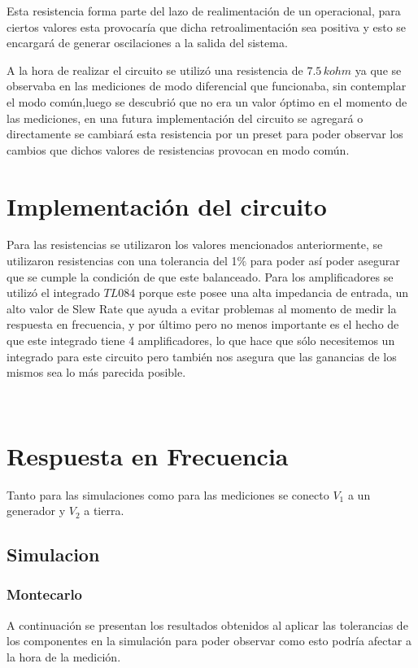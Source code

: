 \documentclass[11pt, a4paper]{article}
\begin{document}
	Esta resistencia forma parte del lazo de realimentación de un operacional, para ciertos valores esta provocaría que dicha retroalimentación sea positiva y esto se encargará de generar oscilaciones a la salida del sistema.
	
	A la hora de realizar el circuito se utilizó una resistencia de $7.5 \, k\si{ohm}$ ya que se observaba en las mediciones de modo diferencial que funcionaba, sin contemplar el modo común,luego se descubrió que no era un valor óptimo en el momento de las mediciones, en una futura implementación del circuito se agregará o directamente se cambiará esta resistencia por un preset para poder observar los cambios que dichos valores de resistencias provocan en modo común.
	
\section{Implementación del circuito}
	Para las resistencias se utilizaron los valores mencionados anteriormente, se utilizaron resistencias con una tolerancia del 1$\%$ para poder así poder asegurar que se cumple la condición de que este balanceado.
	Para los amplificadores se utilizó el integrado $\mathit{TL084}$ porque este posee una alta impedancia de entrada, un alto valor de Slew Rate que ayuda a evitar problemas al momento de medir la respuesta en frecuencia, y por último pero no menos importante es el hecho de que este integrado tiene 4 amplificadores, lo que hace que sólo necesitemos un integrado para este circuito pero también nos asegura que las ganancias de los mismos sea lo más parecida posible.

\
\section{Respuesta en Frecuencia}
Tanto para las simulaciones como para las mediciones se conecto $V_1$ a un generador y $V_2$ a tierra.
\subsection{Simulacion}
\subsubsection{Montecarlo}

	A continuación se presentan los resultados obtenidos al aplicar las tolerancias de los componentes en la simulación para poder observar como esto podría afectar a la hora de la medición.
	
\end{document}

